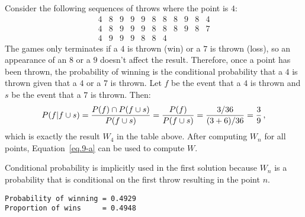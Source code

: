 
\newpage


 Consider the following sequences of throws where the point is $4$:
\[
\begin{array}{rrrrrrrrrrr}
4 & 8 & 9 & 9 & 9 & 8 & 8 & 8 & 9 & 8 & 4\\
4 & 8 & 9 & 9 & 9 & 8 & 8 & 8 & 9 & 8 & 7\\
4 & 9 & 9 & 9 & 8 & 8 & 4
\end{array}
\]
The games only terminates if a $4$ is thrown (win) or a $7$ is thrown (loss), so an appearance of an $8$ or a $9$ doesn't affect the result. Therefore, once a point has been thrown, the probability of winning is the conditional probability that a $4$ is thrown given that a $4$ or  a $7$ is thrown. Let $f$ be the event that a $4$ is thrown and $s$ be the event that a $7$ is thrown. Then:
\[
P(f|f\cup s) = \displaystyle\frac{P(f)\cap P(f\cup s)}{P(f\cup s)}=\displaystyle\frac{P(f)}{P(f\cup s)}=\displaystyle\frac{3/36}{(3+6)/36}=\displaystyle\frac{3}{9}\,,
\]
which is exactly the result $W_4$ in the table above. After computing $W_n$ for all points, Equation~\ref{eq.9-a} can be used to compute $W$.

Conditional probability is implicitly used in the first solution because $W_n$ is a probability that is conditional on the first throw resulting in the point $n$.

\sml{}
\begin{verbatim}
Probability of winning = 0.4929
Proportion of wins     = 0.4948
\end{verbatim}








